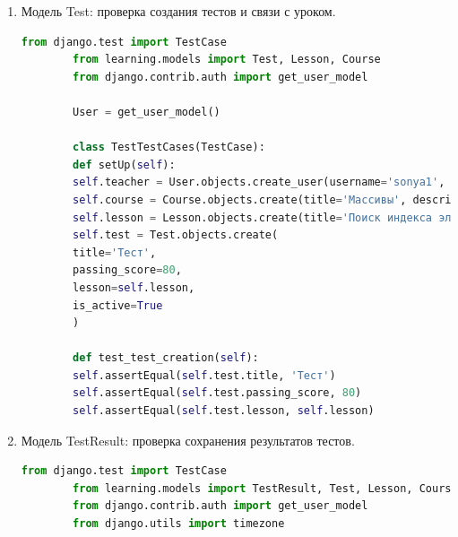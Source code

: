 \begin{enumerate}
\begin{lstlisting}[language=Python, caption=Модульный тест для Lesson, label=lst:lesson_test]
		User = get_user_model()
		
		class LessonTestCases(TestCase):
		def setUp(self):
		self.teacher = User.objects.create_user(username='sonya1', password='vanya232323', is_teacher=True)
		self.course = Course.objects.create(title='Массивы', description='Описание курса', creator=self.teacher)
		self.lesson = Lesson.objects.create(
		title='Что такое массивы',
		content='Содержимое урока',
		order=1,
		course=self.course,
		is_published=True
		)
		
		def test_lesson_creation(self):
		self.assertEqual(self.lesson.title, 'Что такое массивы')
		self.assertEqual(self.lesson.order, 1)
		self.assertEqual(self.lesson.course, self.course)
	\end{lstlisting}
	
	\item Модель Test: проверка создания тестов и связи с уроком.
	\begin{lstlisting}[language=Python, caption=Модульный тест для Test, label=lst:test_test]
		from django.test import TestCase
		from learning.models import Test, Lesson, Course
		from django.contrib.auth import get_user_model
		
		User = get_user_model()
		
		class TestTestCases(TestCase):
		def setUp(self):
		self.teacher = User.objects.create_user(username='sonya1', password='vanya232323', is_teacher=True)
		self.course = Course.objects.create(title='Массивы', description='Описание курса', creator=self.teacher)
		self.lesson = Lesson.objects.create(title='Поиск индекса элемента в массиве', content='Содержимое урока', order=1, course=self.course)
		self.test = Test.objects.create(
		title='Тест',
		passing_score=80,
		lesson=self.lesson,
		is_active=True
		)
		
		def test_test_creation(self):
		self.assertEqual(self.test.title, 'Тест')
		self.assertEqual(self.test.passing_score, 80)
		self.assertEqual(self.test.lesson, self.lesson)
	\end{lstlisting}
	
	\item Модель TestResult: проверка сохранения результатов тестов.
	\begin{lstlisting}[language=Python, caption=Модульный тест для TestResult, label=lst:testresult_test]
		from django.test import TestCase
		from learning.models import TestResult, Test, Lesson, Course
		from django.contrib.auth import get_user_model
		from django.utils import timezone
		

\end{lstlisting}
\end{enumerate}
